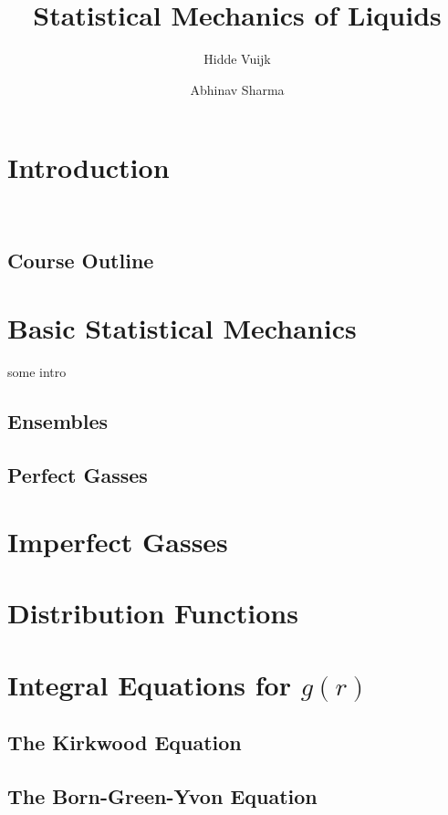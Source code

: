 \documentclass[a4paper,11pt]{article}
\title{Statistical Mechanics of Liquids}
\author[a]{Hidde Vuijk}
\author[a,b]{Abhinav Sharma}
\affiliation[a]{Leibniz-Institut f\"ur Polymerforschung, Dresden, Germany}
\affiliation[b]{TU Dresden}
\begin{document}
 
\maketitle
\flushbottom

\newpage
\section{Introduction}\
\subsection{Course Outline}

\newpage
\section{Basic Statistical Mechanics}\label{sec:basic}

some intro

\subsection{Ensembles}\label{sec:enembles}
\subsection{Perfect Gasses}\label{sec:perfect}
\newpage
\section{Imperfect Gasses}\label{sec:imperfect}

\newpage
\section{Distribution Functions}\label{sec:distribution}


\newpage
\section{Integral Equations for $g(r)$}\label{sec:integral}
\subsection{The Kirkwood Equation}\label{ssec:kirkwood}

\subsection{The Born-Green-Yvon Equation}\label{ssec:born}
\end{document}

